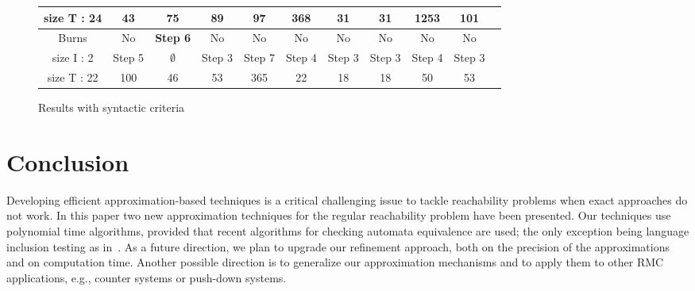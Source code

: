 \documentclass[]{llncs}
\begin{document}
\begin{figure}[tb]
\begin{bigcenter}
\begin{scriptsize}
\begin{tabular}{|c|c|c|c|c|c|c|c|c|c|c|}
size T : 24		&	43					&	75					&	89					&	97					&	368				&	31				&	31				&	1253			&	101				\\	
\hline
Burns		&	No					&	\textbf{Step 6}			&	No					&	No					&	No				&	No				&	No				&	No				&	No				\\
size I : 2		&	Step 5				&	$\mathbf{\emptyset}$	&	Step 3				&	Step 7				&	Step 4			&	Step 3			&	Step 3			&	Step 4			&	Step 3			\\	
size T : 22		&	100					&	46					&	53					&	365					&	22				&	18				&	18				&	50				&	53				\\	
\hline
\end{tabular}
\end{scriptsize}
\caption{Results with syntactic criteria}
\label{tableau_resultats_master}
\end{bigcenter}
\end{figure}























\section{Conclusion}

Developing efficient approximation-based techniques is a critical
challenging issue to tackle reachability problems when exact
approaches do not work.  In this paper
two new approximation techniques for the regular reachability problem
have been presented. 
Our techniques use polynomial time algorithms, provided that 
recent algorithms for checking automata equivalence are used; the only exception being language inclusion testing 
as in~\cite{DBLP:conf/tacas/DoyenR10,DBLP:conf/tacas/AbdullaCHMV10,BONCHI-2012-674660}.
As a future direction, we plan to upgrade our refinement approach, both on the precision of the
approximations and on computation time. Another possible direction is to generalize 
our approximation mechanisms and to apply them to 
other RMC applications, e.g.,  
counter systems or push-down systems.



\end{document}

